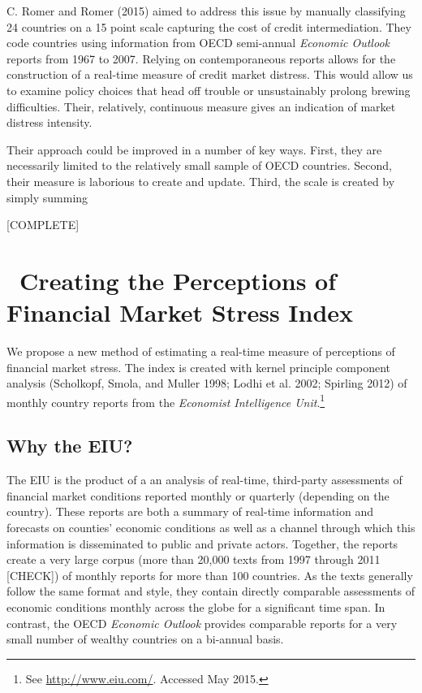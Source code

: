 \documentclass[]{article}
\let\rmarkdownfootnote\footnote%
\def\footnote{\protect\rmarkdownfootnote}
\begin{document}
C. Romer and Romer (2015) aimed to address this issue by manually
classifying 24 countries on a 15 point scale capturing the cost of
credit intermediation. They code countries using information from OECD
semi-annual \emph{Economic Outlook} reports from 1967 to 2007. Relying
on contemporaneous reports allows for the construction of a real-time
measure of credit market distress. This would allow us to examine policy
choices that head off trouble or unsustainably prolong brewing
difficulties. Their, relatively, continuous measure gives an indication
of market distress intensity.

Their approach could be improved in a number of key ways. First, they
are necessarily limited to the relatively small sample of OECD
countries. Second, their measure is laborious to create and update.
Third, the scale is created by simply summing

{[}COMPLETE{]}

\section{~Creating the Perceptions of Financial Market Stress
Index}\label{creating-the-perceptions-of-financial-market-stress-index}

We propose a new method of estimating a real-time measure of perceptions
of financial market stress. The index is created with kernel principle
component analysis (Scholkopf, Smola, and Muller 1998; Lodhi et al.
2002; Spirling 2012) of monthly country reports from the \emph{Economist
Intelligence Unit}.\footnote{See \url{http://www.eiu.com/}. Accessed May
  2015.}

\subsection{Why the EIU?}\label{why-the-eiu}

The EIU is the product of a an analysis of real-time, third-party
assessments of financial market conditions reported monthly or quarterly
(depending on the country). These reports are both a summary of
real-time information and forecasts on counties' economic conditions as
well as a channel through which this information is disseminated to
public and private actors. Together, the reports create a very large
corpus (more than 20,000 texts from 1997 through 2011 {[}CHECK{]}) of
monthly reports for more than 100 countries. As the texts generally
follow the same format and style, they contain directly comparable
assessments of economic conditions monthly across the globe for a
significant time span. In contrast, the OECD \emph{Economic Outlook}
provides comparable reports for a very small number of wealthy countries
on a bi-annual basis.
\end{document}
